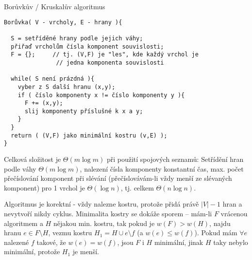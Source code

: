 \begin{algoritmusN}{Borůvkův / Kruskalův algoritmus}
\begin{verbatim}
Borůvka( V - vrcholy, E - hrany ){

  S = setříděné hrany podle jejich váhy;
  přiřaď vrcholům čísla komponent souvislosti;
  F = {};     // tj. (V,F) je "les", kde každý vrchol je 
               // jedna komponenta souvislosti
  
  while( S není prázdná ){
    vyber z S další hranu (x,y);
    if ( číslo komponenty x != číslo komponenty y ){
      F += (x,y);
      slij komponenty příslušné k x a y;
    }
  } 
  return ( (V,F) jako minimální kostru (v,E) );
}
\end{verbatim}

Celková složitost je $\Theta(m\log m)$ při použití spojových seznamů: Setřídění hran podle váhy $\Theta(m\log m)$, nalezení čísla komponenty konstantní čas, max. počet přečíslování komponent při slévání (přečíslovávám-li vždy menší ze slévaných komponent) pro 1 vrchol je $\Theta(\log n)$, tj. celkem $\Theta(n\log n)$.

Algoritmus je korektní - vždy nalezne kostru, protože přidá právě $|V|-1$ hran a nevytvoří nikdy cyklus. Minimalita kostry se dokáže sporem -- mám-li $F$ vrácenou algoritmem a $H$ nějakou min. kostru, tak pokud je $w(F)>w(H)$, najdu hranu $e\in F\setminus H$, vezmu kostru $H_1=H\cup e\setminus f$ (a $w(e)\leq w(f)$). Pokud mám $\forall e$ nalezené $f$ takové, že $w(e)=w(f)$, jsou $F$ i $H$ minimální, jinak $H$ taky nebylo minimální, protože $H_1$ je menší.
\end{algoritmusN}


